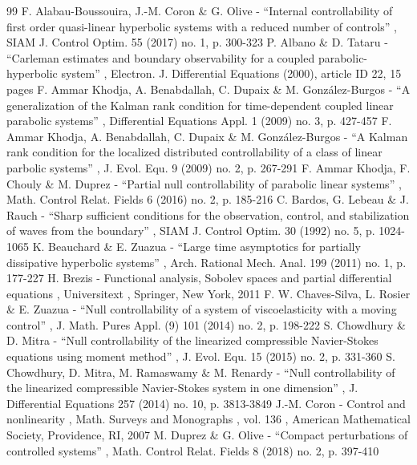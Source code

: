 \documentclass[11pt]{article}
\theoremstyle{plain}
\theoremstyle{definition}
\theoremstyle{remark}
\begin{document}
\begin{thebibliography}{99}
 F. Alabau-Boussouira, J.-M. Coron \& G. Olive - “Internal controllability of first order quasi-linear hyperbolic systems with a reduced number of controls” , SIAM J. Control Optim. 55 (2017) no. 1, p. 300-323
 P. Albano \& D. Tataru - “Carleman estimates and boundary observability for a coupled parabolic-hyperbolic system” , Electron. J. Differential Equations (2000), article ID 22, 15 pages
 F. Ammar Khodja, A. Benabdallah, C. Dupaix \& M. González-Burgos - “A generalization of the Kalman rank condition for time-dependent coupled linear parabolic systems” , Differential Equations Appl. 1 (2009) no. 3, p. 427-457
 F. Ammar Khodja, A. Benabdallah, C. Dupaix \& M. González-Burgos - “A Kalman rank condition for the localized distributed controllability of a class of linear parbolic systems” , J. Evol. Equ. 9 (2009) no. 2, p. 267-291
 F. Ammar Khodja, F. Chouly \& M. Duprez - “Partial null controllability of parabolic linear systems” , Math. Control Relat. Fields 6 (2016) no. 2, p. 185-216
 C. Bardos, G. Lebeau \& J. Rauch - “Sharp sufficient conditions for the observation, control, and stabilization of waves from the boundary” , SIAM J. Control Optim. 30 (1992) no. 5, p. 1024-1065
 K. Beauchard \& E. Zuazua - “Large time asymptotics for partially dissipative hyperbolic systems” , Arch. Rational Mech. Anal. 199 (2011) no. 1, p. 177-227
 H. Brezis - Functional analysis, Sobolev spaces and partial differential equations , Universitext , Springer, New York, 2011
 F. W. Chaves-Silva, L. Rosier \& E. Zuazua - “Null controllability of a system of viscoelasticity with a moving control” , J. Math. Pures Appl. (9) 101 (2014) no. 2, p. 198-222
 S. Chowdhury \& D. Mitra - “Null controllability of the linearized compressible Navier-Stokes equations using moment method” , J. Evol. Equ. 15 (2015) no. 2, p. 331-360
 S. Chowdhury, D. Mitra, M. Ramaswamy \& M. Renardy - “Null controllability of the linearized compressible Navier-Stokes system in one dimension” , J. Differential Equations 257 (2014) no. 10, p. 3813-3849
 J.-M. Coron - Control and nonlinearity , Math. Surveys and Monographs , vol. 136 , American Mathematical Society, Providence, RI, 2007
 M. Duprez \& G. Olive - “Compact perturbations of controlled systems” , Math. Control Relat. Fields 8 (2018) no. 2, p. 397-410

\end{thebibliography}
\end{document}
